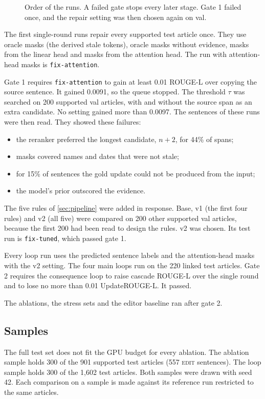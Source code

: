 \documentclass[]{paper}
\newcommand{\edit}{\textsc{edit}}
\newcommand{\run}[1]{\texttt{#1}}
\begin{document}
\begin{figure}[t]
\centering

\caption{Order of the runs. A failed gate stops every later stage. Gate 1 failed once, and the repair setting was then chosen again on val.}
\label{fig:order}
\end{figure}

The first single-round runs repair every supported test article once. They use oracle masks (the derived stale tokens), oracle masks without evidence, masks from the linear head and masks from the attention head. The run with attention-head masks is \run{fix-attention}.

Gate 1 requires \run{fix-attention} to gain at least 0.01 ROUGE-L over copying the source sentence. It gained 0.0091, so the queue stopped. The threshold $\tau$ was searched on 200 supported val articles, with and without the source span as an extra candidate. No setting gained more than 0.0097. The sentences of these runs were then read. They showed these failures:
\begin{itemize}
\item the reranker preferred the longest candidate, $n+2$, for 44\% of spans;
\item masks covered names and dates that were not stale;
\item for 15\% of sentences the gold update could not be produced from the input;
\item the model's prior outscored the evidence.
\end{itemize}
The five rules of \cref{sec:pipeline} were added in response. Base, v1 (the first four rules) and v2 (all five) were compared on 200 other supported val articles, because the first 200 had been read to design the rules. v2 was chosen. Its test run is \run{fix-tuned}, which passed gate 1.

Every loop run uses the predicted sentence labels and the attention-head masks with the v2 setting. The four main loops run on the 220 linked test articles. Gate 2 requires the consequence loop to raise cascade ROUGE-L over the single round and to lose no more than 0.01 UpdateROUGE-L. It passed.

The ablations, the stress sets and the editor baseline ran after gate 2.

\subsection{Samples}

The full test set does not fit the GPU budget for every ablation. The ablation sample holds 300 of the 901 supported test articles (557 \edit{} sentences). The loop sample holds 300 of the 1,602 test articles. Both samples were drawn with seed 42. Each comparison on a sample is made against its reference run restricted to the same articles.
\end{document}
